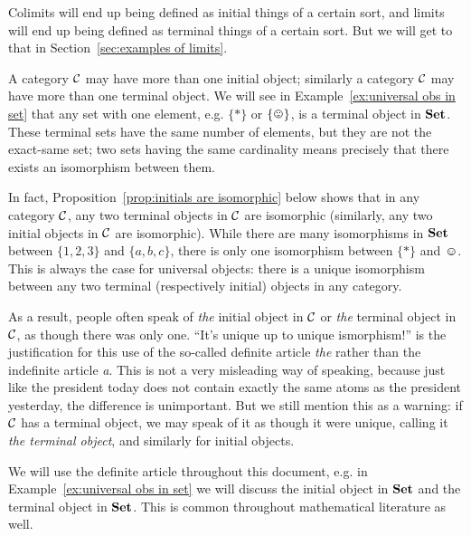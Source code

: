 \documentclass[CT4S-EN-RU]{subfiles}
\begin{document}
\begin{blockENG}
Colimits will end up being defined as initial things of a certain sort, and limits will end up being defined as terminal things of a certain sort. But we will get to that in Section~\ref{sec:examples of limits}.
\end{blockENG}

\begin{blockRUS}
\end{blockRUS}

\begin{warningENG}
A category $\mathcal{C}$ may have more than one initial object; similarly a category $\mathcal{C}$ may have more than one terminal object. We will see in Example~\ref{ex:universal obs in set} that any set with one element, e.g. $\{*\}$ or $\singleton$, is a terminal object in ${\mathbf{Set}}$. These terminal sets have the same number of elements, but they are not the exact-same set; two sets having the same cardinality means precisely that there exists an isomorphism between them.

In fact, Proposition~\ref{prop:initials are isomorphic} below shows that in any category $\mathcal{C}$, any two terminal objects in $\mathcal{C}$ are isomorphic (similarly, any two initial objects in $\mathcal{C}$ are isomorphic). While there are many isomorphisms in ${\mathbf{Set}}$ between $\{1,2,3\}$ and $\{a,b,c\}$, there is only one isomorphism between $\{*\}$ and $\smiley$. This is always the case for universal objects: there is a unique isomorphism between any two terminal (respectively initial) objects in any category.

As a result, people often speak of {\em the} initial object in $\mathcal{C}$ or {\em the} terminal object in $\mathcal{C}$, as though there was only one. “It's unique up to unique ismorphism!” is the justification for this use of the so-called definite article {\em the} rather than the indefinite article {\em a}. This is not a very misleading way of speaking, because just like the president today does not contain exactly the same atoms as the president yesterday, the difference is unimportant. But we still mention this as a warning: if $\mathcal{C}$ has a terminal object, we may speak of it as though it were unique, calling it {\em the terminal object}, and similarly for initial objects.

We will use the definite article throughout this document, e.g. in Example~\ref{ex:universal obs in set} we will discuss the initial object in ${\mathbf{Set}}$ and the terminal object in ${\mathbf{Set}}$. This is common throughout mathematical literature as well.
\end{warningENG}
\end{document}
